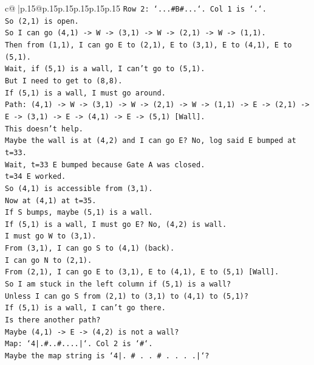 \documentclass{article}
\begin{document}
{\begin{supertabular}{c@{$\;$}|p{.15\linewidth}@{}p{.15\linewidth}p{.15\linewidth}p{.15\linewidth}p{.15\linewidth}p{.15\linewidth}}
{{{\texttt{Row 2: `...\#B\#...`. Col 1 is `.`.} \\
\texttt{So (2,1) is open.} \\
\texttt{So I can go (4,1) {-}> W {-}> (3,1) {-}> W {-}> (2,1) {-}> W {-}> (1,1).} \\
\texttt{Then from (1,1), I can go E to (2,1), E to (3,1), E to (4,1), E to (5,1).} \\
\texttt{Wait, if (5,1) is a wall, I can't go to (5,1).} \\
\texttt{But I need to get to (8,8).} \\
\texttt{If (5,1) is a wall, I must go around.} \\
\texttt{Path: (4,1) {-}> W {-}> (3,1) {-}> W {-}> (2,1) {-}> W {-}> (1,1) {-}> E {-}> (2,1) {-}> E {-}> (3,1) {-}> E {-}> (4,1) {-}> E {-}> (5,1) {[}Wall{]}.} \\
\texttt{This doesn't help.} \\
\texttt{Maybe the wall is at (4,2) and I can go E? No, log said E bumped at t=33.} \\
\texttt{Wait, t=33 E bumped because Gate A was closed.} \\
\texttt{t=34 E worked.} \\
\texttt{So (4,1) is accessible from (3,1).} \\
\texttt{Now at (4,1) at t=35.} \\
\texttt{If S bumps, maybe (5,1) is a wall.} \\
\texttt{If (5,1) is a wall, I must go E? No, (4,2) is wall.} \\
\texttt{I must go W to (3,1).} \\
\texttt{From (3,1), I can go S to (4,1) (back).} \\
\texttt{I can go N to (2,1).} \\
\texttt{From (2,1), I can go E to (3,1), E to (4,1), E to (5,1) {[}Wall{]}.} \\
\texttt{So I am stuck in the left column if (5,1) is a wall?} \\
\texttt{Unless I can go S from (2,1) to (3,1) to (4,1) to (5,1)?} \\
\texttt{If (5,1) is a wall, I can't go there.} \\
\texttt{Is there another path?} \\
\texttt{Maybe (4,1) {-}> E {-}> (4,2) is not a wall?} \\
\texttt{Map: `4|.\#..\#....|`. Col 2 is `\#`.} \\
\texttt{Maybe the map string is `4|. \# . . \# . . . .|`?} \\
}}}
\end{supertabular}}
\end{document}
